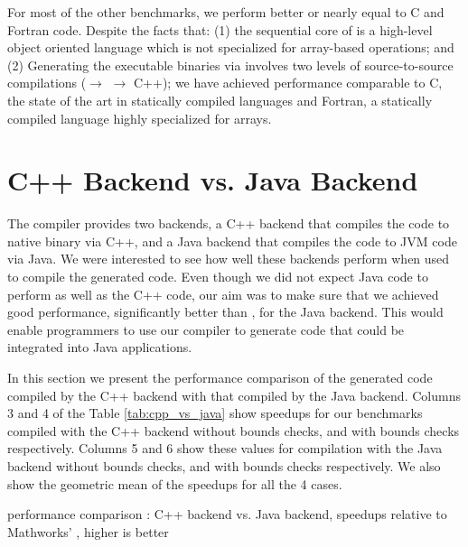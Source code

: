 For most of the other benchmarks, we perform better or nearly equal to C and
Fortran code. Despite the facts that: (1) the sequential core of \xten is a
high-level object oriented language which is not specialized for array-based
operations; and (2) Generating the executable binaries via \mixten involves two
levels of source-to-source compilations (\matlab $\rightarrow$ \xten
$\rightarrow$ C++); we have achieved performance comparable to C, the state of
the art in statically compiled languages and Fortran, a statically compiled
language highly specialized for arrays.
       
\section{\xten C++ Backend vs. \xten Java Backend}

The \xten compiler provides two backends, a C++ backend that compiles the \xten
code to native binary via C++, and a Java backend that compiles the \xten code
to JVM code via Java. We were interested to see how well these backends perform
when used to compile the \mixten generated code. Even though we did not expect
Java code to perform as well as the C++ code, our aim was to make sure that we
achieved good performance, significantly better than \matlab, for the \xten
Java backend.  This would enable \matlab programmers to use our \mixten
compiler to generate code that could be integrated into Java applications. 

In this section we present the performance comparison of the \mixten
generated \xten code compiled by the \xten C++ backend with that compiled by
the \xten Java backend. Columns 3 and 4 of the Table \ref{tab:cpp_vs_java} show
speedups for our benchmarks compiled with the \xten C++ backend without bounds
checks, and with bounds checks respectively. Columns 5 and 6 show these values
for compilation with the \xten Java backend without bounds checks, and with
bounds checks respectively. We also show the geometric mean of the speedups for
all the 4 cases. 

\begin{table}[htbp]
\begin{center} 
\begin{footnotesize}

\end{footnotesize}
\caption{\mixten performance comparison : \xten C++ backend vs. \xten
Java backend, speedups relative to Mathworks' \matlab, higher is better} 
\label{tab:cpp_vs_java} 
\end{center} 
\end{table}


